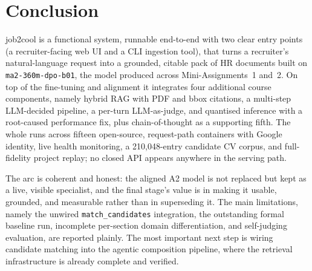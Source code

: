 \section{Conclusion}

job2cool is a functional system, runnable end-to-end with two clear entry points (a
recruiter-facing web UI and a CLI ingestion tool), that turns a recruiter's natural-language
request into a grounded, citable pack of HR documents built on \verb|ma2-360m-dpo-b01|, the
model produced across Mini-Assignments~1 and~2. On top of the fine-tuning and alignment it
integrates four additional course components, namely hybrid RAG with PDF and bbox citations,
a multi-step LLM-decided pipeline, a per-turn LLM-as-judge, and quantised inference with a
root-caused performance fix, plus chain-of-thought as a supporting fifth. The whole runs
across fifteen open-source, request-path containers with Google identity, live health
monitoring, a 210,048-entry candidate CV corpus, and full-fidelity project replay; no closed
API appears anywhere in the serving path.

The arc is coherent and honest: the aligned A2 model is not replaced but kept as a live,
visible specialist, and the final stage's value is in making it usable, grounded, and
measurable rather than in superseding it. The main limitations, namely the unwired
\verb|match_candidates| integration, the outstanding formal baseline run, incomplete
per-section domain differentiation, and self-judging evaluation, are reported plainly. The
most important next step is wiring candidate matching into the agentic composition pipeline,
where the retrieval infrastructure is already complete and verified.

